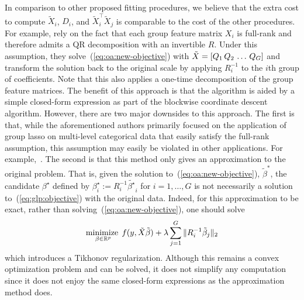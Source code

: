 In comparison to other proposed fitting procedures,
we believe that the extra cost to compute $\tilde{X}_i$, $D_i$, and $\tilde{X}_i^\top \tilde{X}_j$
is comparable to the cost of the other procedures.
For example, \citet{yuan:2006,meier:2008} rely on the fact that
each group feature matrix $X_i$ is full-rank and therefore admits a QR decomposition with an invertible $R$.
Under this assumption, they solve~(\ref{eq:oa:new-objective}) with $\tilde{X} = \left[Q_1 \, Q_2 \, \ldots \, Q_G\right]$
and transform the solution back to the original scale by applying $R_i^{-1}$ to the $i$th group of coefficients.
Note that this also applies a one-time decomposition of the group feature matrices.
The benefit of this approach is that the algorithm is aided by a simple closed-form expression
as part of the blockwise coordinate descent algorithm.
However, there are two major downsides to this approach.
The first is that, while the aforementioned authors primarily focused on the application of group lasso 
on multi-level categorical data that easily satisfy the full-rank assumption,
this assumption may easily be violated in other applications.
For example,~.
The second is that this method only gives an approximation to the original problem.
That is, given the solution to~(\ref{eq:oa:new-objective}), $\tilde{\beta}^*$,
the candidate $\beta^\star$ defined by $\beta^\star_i := R_i^{-1} \tilde{\beta^\star}_i$ 
for $i=1,\ldots, G$ is not necessarily a solution to~(\ref{eq:glp:objective})
with the original data.
Indeed, for this approximation to be exact, 
rather than solving~(\ref{eq:oa:new-objective}),
one should solve
\begin{align*}
    \operatorname*{minimize\;}_{\beta \in \mathbb{R}^p}
    f(y, \tilde{X} \tilde{\beta})
    + \lambda \sum\limits_{j=1}^G \|R_i^{-1} \tilde{\beta}_j\|_2
\end{align*}
which introduces a Tikhonov regularization.
Although this remains a convex optimization problem and can be solved,
it does not simplify any computation since it does not enjoy the same 
closed-form expressions as the approximation method does.

